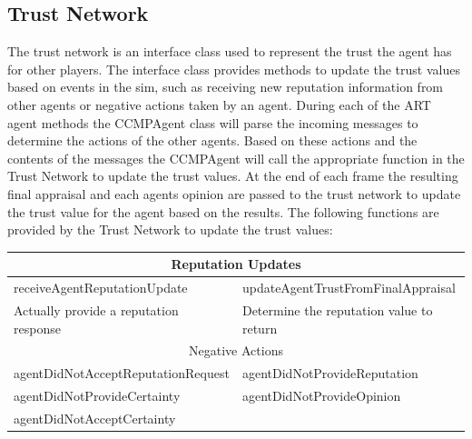 \subsection{Trust Network}
The trust network is an interface class used to represent the trust the agent
has for other players.  The interface class provides methods to update the
trust values based on events in the sim, such as receiving new reputation
information from other agents or negative actions taken by an agent.  During
each of the ART agent methods the CCMPAgent class will parse the incoming
messages to determine the actions of the other agents.  Based on these actions
and the contents of the messages the CCMPAgent will call the appropriate
function in the Trust Network to update the trust values.  At the end of each
frame the resulting final appraisal and each agents opinion are passed to the trust network 
to update the trust value for the agent based on the results. The following
functions are provided by the Trust Network to update the trust values:

\begin{center}
\begin{tabular}{|l|l|}
\hline
\multicolumn{2}{|c|}{Reputation Updates} \\
\hline
receiveAgentReputationUpdate & updateAgentTrustFromFinalAppraisal \\
\hline
Actually provide a reputation response & Determine the reputation value to
return \\ 
\hline
\multicolumn{2}{|c|}{Negative Actions} \\
\hline
agentDidNotAcceptReputationRequest & agentDidNotProvideReputation \\
\hline
agentDidNotProvideCertainty & agentDidNotProvideOpinion \\
\hline
agentDidNotAcceptCertainty & \\
\hline
\end{tabular}
\end{center}

